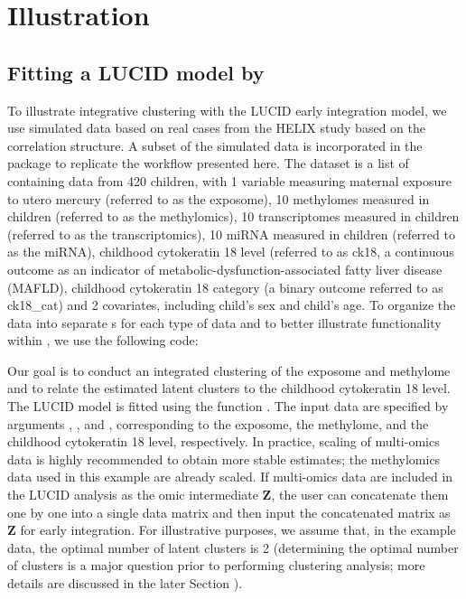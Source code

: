 \section{Illustration} \label{sec3}
\subsection{Fitting a LUCID model by } \label{sec3.1}
To illustrate integrative clustering with the LUCID early integration model, we use simulated data based on real cases from the HELIX study based on the correlation structure. A subset of the simulated data is incorporated in the  package to replicate the workflow presented here. The dataset is a list of  containing data from 420 children, with 1 variable measuring maternal exposure to utero mercury (referred to as the exposome), 10 methylomes measured in children (referred to as the methylomics), 10 transcriptomes measured in children (referred to as the transcriptomics), 10 miRNA measured in children (referred to as the miRNA), childhood cytokeratin 18 level (referred to as ck18, a continuous outcome as an indicator of metabolic-dysfunction-associated fatty liver disease (MAFLD), childhood cytokeratin 18 category (a binary outcome referred to as ck18\_cat) and 2 covariates, including child's sex and child's age. To organize the data into separate s for each type of data and to better illustrate functionality within , we use the following code:
Our goal is to conduct an integrated clustering of the exposome and methylome and to relate the estimated latent clusters to the childhood cytokeratin 18 level. The LUCID model is fitted using the function . The input data are specified by arguments , , and , corresponding to the exposome, the methylome, and the childhood cytokeratin 18 level, respectively. In practice, scaling of multi-omics data is highly recommended to obtain more stable estimates; the methylomics data used in this example are already scaled. If multi-omics data are included in the LUCID analysis as the omic intermediate $\bm Z$, the user can concatenate them one by one into a single data matrix and then input the concatenated matrix as $\bm Z$ for early integration. For illustrative purposes, we assume that, in the example data, the optimal number of latent clusters is 2 (determining the optimal number of clusters is a major question prior to performing clustering analysis; more details are discussed in the later Section ). 
